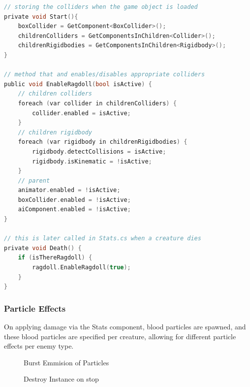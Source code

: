 \documentclass[11pt]{report}
\begin{document}
\begin{lstlisting}[language=c]
// storing the colliders when the game object is loaded
private void Start(){
    boxCollider = GetComponent<BoxCollider>();
    childrenColliders = GetComponentsInChildren<Collider>();
    childrenRigidbodies = GetComponentsInChildren<Rigidbody>();
}

// method that and enables/disables appropriate colliders
public void EnableRagdoll(bool isActive) {
    // children colliders
    foreach (var collider in childrenColliders) {
        collider.enabled = isActive;
    }
    // children rigidbody
    foreach (var rigidbody in childrenRigidbodies) {
        rigidbody.detectCollisions = isActive;
        rigidbody.isKinematic = !isActive;
    }
    // parent
    animator.enabled = !isActive;
    boxCollider.enabled = !isActive;
    aiComponent.enabled = !isActive;
}

// this is later called in Stats.cs when a creature dies
private void Death() {
    if (isThereRagdoll) {
        ragdoll.EnableRagdoll(true);
    }
}
\end{lstlisting}

\subsubsection{Particle Effects}
On applying damage via the Stats component, blood particles are spawned, and these blood particles are specified per creature, allowing for different particle effects per enemy type. 

\begin{figure}[H]
    \begin{minipage}{.5\textwidth}
        \centering
        \caption{Burst Emmision of Particles}
    \end{minipage}
    \begin{minipage}{.5\textwidth}
        \centering
        \caption{Destroy Instance on stop}
    \end{minipage}
\end{figure}
\end{document}
